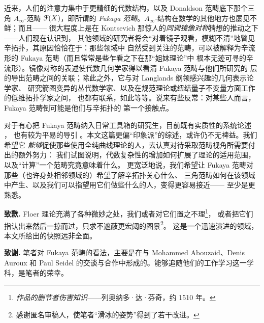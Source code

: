 
近来，人们的注意力集中于更精细的代数结构，以及 Donaldson 范畴底下那个三角 $A_\infty$-范畴
$\EuScript{F}(X)$，即所谓的 \emph{Fukaya 范畴}。$A_\infty$-结构在数学的其他地方也屡见不鲜；而且——
很大程度上是在 Kontsevich 那惊人的\emph{同调镜像对称}猜想的推动之下——人们现在认识到，
其他领域的研究者将会“对着镜子观看，模糊不清”地瞥见辛拓扑，其原因恰恰在于：那些领域中
自然受到关注的范畴，可以被解释为辛流形的 Fukaya 范畴（而且常常是些乍看之下在那“姐妹理论”中
根本无迹可寻的辛流形）。镜像对称的表述使代数几何学家得以看清 Fukaya 范畴与他们所研究的
层的导出范畴之间的关联；除此之外，它与对 Langlands 纲领感兴趣的几何表示论学家、
研究箭图变异的丛代数学家、以及在规范理论或纽结量子不变量方面工作的低维拓扑学家之间，
也都有联系，如此等等。说来有些反常：对某些人而言，Fukaya 范畴倒可能是他们与辛拓扑的
第一个接触点。


对于有心把 Fukaya 范畴纳入日常工具箱的研究生，目前既有实质性的系统论述 \cite{FO3, FCPLT}，
也有较为平易的导引 \cite{Auroux}。本文这篇更偏“印象派”的综述，或许仍不无裨益。我们希望它
\emph{能够}促使那些使用全纯曲线理论的人，去认真对待采取范畴视角所需要付出的额外努力：
我们试图说明，代数复杂性的增加如何扩展了理论的适用范围，以及“计算”一个范畴究竟意味着什么。
更宽泛地说，我们希望让 Fukaya 范畴对那些（也许身处相邻领域的）希望了解辛拓扑关心什么、
三角范畴如何在该领域中产生、以及我们可以指望用它们做些什么的人，变得更容易接近——
至少是更熟悉。

\noindent\textbf{致歉.} Floer 理论充满了各种微妙之处，我们或者对它们置之不理\footnote{%
\emph{作品的删节者伤害知识}——列奥纳多·达·芬奇，约 1510 年。}，
或者把它们指认出来然后一掠而过，只求不遮蔽更宏阔的图景\footnote{%
感谢匿名审稿人，使笔者“滑冰的姿势”得到了若干改进。}。
这是一个迅速演进的领域，本文所给出的快照远非全面。

\vspace{0.2cm}
\noindent\textbf{致谢.} 笔者对 Fukaya 范畴的看法，主要是在与 Mohammed Abouzaid、Denis Auroux
和 Paul Seidel 的交谈与合作中形成的。能够追随他们的工作学习这一学科，是笔者的荣幸。

